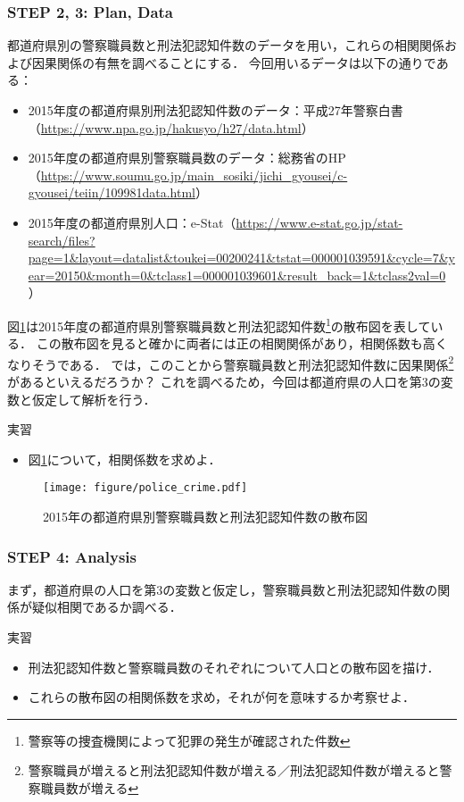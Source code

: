 \subsubsection*{STEP 2, 3: Plan, Data}
%
都道府県別の警察職員数と刑法犯認知件数のデータを用い，これらの相関関係および因果関係の有無を調べることにする．
%
今回用いるデータは以下の通りである：
%
\begin{itemize}
\item
2015年度の都道府県別刑法犯認知件数のデータ：平成27年警察白書（\url{https://www.npa.go.jp/hakusyo/h27/data.html}）
\item
2015年度の都道府県別警察職員数のデータ：総務省のHP（\url{https://www.soumu.go.jp/main_sosiki/jichi_gyousei/c-gyousei/teiin/109981data.html}）
\item
2015年度の都道府県別人口：e-Stat（\url{https://www.e-stat.go.jp/stat-search/files?page=1&layout=datalist&toukei=00200241&tstat=000001039591&cycle=7&year=20150&month=0&tclass1=000001039601&result_back=1&tclass2val=0}）
\end{itemize}
%

%
図\ref{fig:police}は2015年度の都道府県別警察職員数と刑法犯認知件数\footnote{警察等の捜査機関によって犯罪の発生が確認された件数}の散布図を表している．
%
この散布図を見ると確かに両者には正の相関関係があり，相関係数も高くなりそうである．
%
では，このことから警察職員数と刑法犯認知件数に因果関係\footnote{警察職員が増えると刑法犯認知件数が増える／刑法犯認知件数が増えると警察職員数が増える}があるといえるだろうか？
%
これを調べるため，今回は都道府県の人口を第3の変数と仮定して解析を行う．
%

%
\begin{itembox}[l]{実習}
%
\begin{itemize}
\item
図\ref{fig:police}について，相関係数を求めよ．
\end{itemize}
%
\end{itembox}
%

%
\begin{figure}[H]
	\centering
	\texttt{[image: figure/police\_crime.pdf]}
	\caption{2015年の都道府県別警察職員数と刑法犯認知件数の散布図}
	\label{fig:police}
\end{figure}
%

\subsubsection*{STEP 4: Analysis}
%
まず，都道府県の人口を第3の変数と仮定し，警察職員数と刑法犯認知件数の関係が疑似相関であるか調べる．
%
\begin{itembox}[l]{実習}
%
\begin{itemize}
\item
刑法犯認知件数と警察職員数のそれぞれについて人口との散布図を描け．
\item
これらの散布図の相関係数を求め，それが何を意味するか考察せよ．
\end{itemize}
%
\end{itembox}
%

